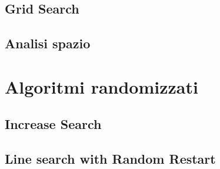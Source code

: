 \subsection{Grid Search}
\subsection{Analisi spazio}
\section{Algoritmi randomizzati}
\subsection{Increase Search}
\subsection{Line search with Random Restart}


